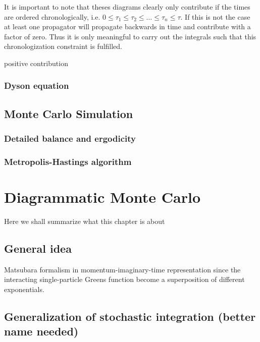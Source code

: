 \documentclass[12pt]{report}
\newcommand{\todo}[1]{{\leavevmode\color{todo}#1}}
\begin{document}
It is important to note that theses diagrams clearly only contribute if the times are ordered chronologically, i.e. $ 0 \le \tau_1 \le \tau_2 \le \dots \le \tau_n \le \tau $. If this is not the case at least one propagator will propagate backwards in time and contribute with a factor of zero. Thus it is only meaningful to carry out the integrals such that this chronologization constraint is fulfilled.

\todo{positive contribution}


\subsection{Dyson equation}



\section{Monte Carlo Simulation}

\subsection{Detailed balance and ergodicity}

\subsection{Metropolis-Hastings algorithm}



\chapter{Diagrammatic Monte Carlo}

\todo{Here we shall summarize what this chapter is about}

\section{General idea}

\todo{Matsubara formalism in momentum-imaginary-time representation since the interacting single-particle Greens function become a superposition of different exponentials.}

\section{Generalization of stochastic integration (better name needed)}
\end{document}
